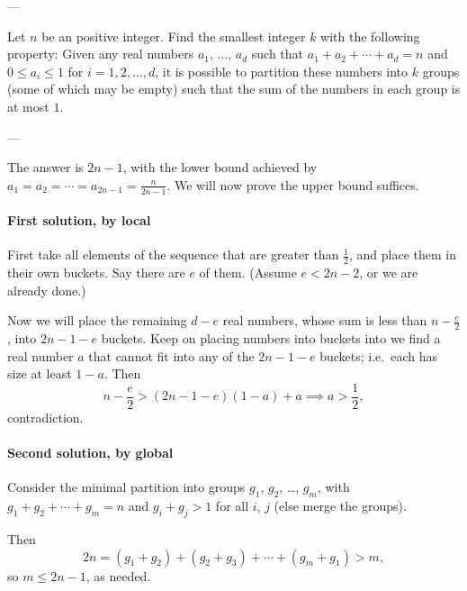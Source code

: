 
---

Let $n$ be an positive integer. Find the smallest integer $k$ with the following property: Given any real numbers $a_1$, $\ldots$, $a_d$ such that $a_1+a_2+\cdots+a_d=n$ and $0\le a_i\le1$ for $i=1,2,\ldots,d$, it is possible to partition these numbers into $k$ groups (some of which may be empty) such that the sum of the numbers in each group is at most $1$.

---

The answer is $2n-1$, with the lower bound achieved by $a_1=a_2=\cdots=a_{2n-1}=\frac n{2n-1}$. We will now prove the upper bound suffices.

\paragraph{First solution, by local} First take all elements of the sequence that are greater than $\frac12$, and place them in their own buckets. Say there are $e$ of them. (Assume $e<2n-2$, or we are already done.)

Now we will place the remaining $d-e$ real numbers, whose sum is less than $n-\frac e2$, into $2n-1-e$ buckets. Keep on placing numbers into buckets into we find a real number $a$ that cannot fit into any of the $2n-1-e$ buckets; i.e.\ each has size at least $1-a$. Then
\[n-\frac e2>(2n-1-e)(1-a)+a\implies a>\frac12,\]
contradiction.

\paragraph{Second solution, by global} Consider the minimal partition into groups $g_1$, $g_2$, \ldots, $g_m$, with $g_1+g_2+\cdots+g_m=n$ and $g_i+g_j>1$ for all $i$, $j$ (else merge the groups).

Then
\[2n=(g_1+g_2)+(g_2+g_3)+\cdots+(g_m+g_1)>m,\]
so $m\le2n-1$, as needed.

